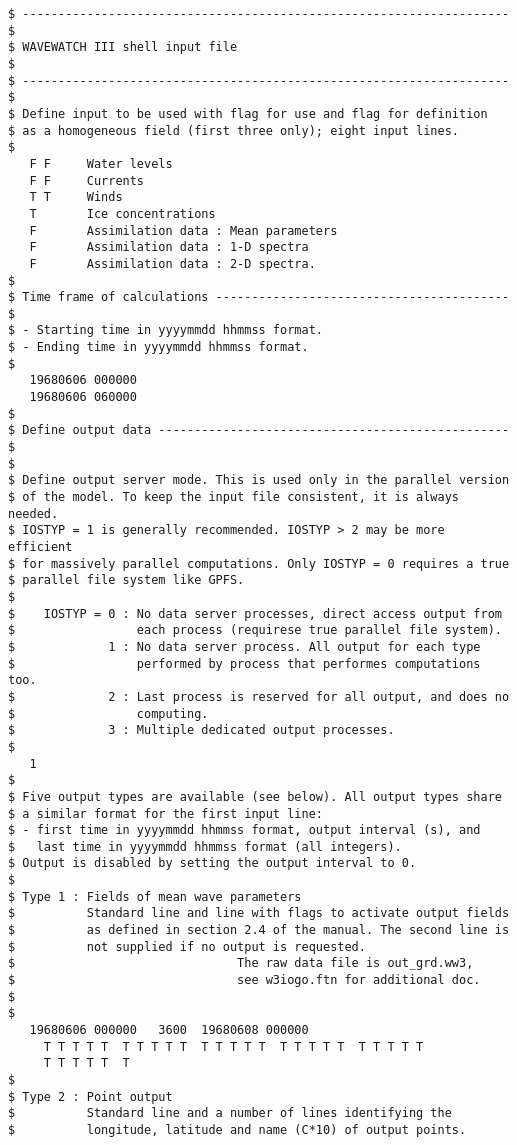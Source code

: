 \begin{verbatim}
$ -------------------------------------------------------------------- $
$ WAVEWATCH III shell input file                                       $
$ -------------------------------------------------------------------- $
$ Define input to be used with flag for use and flag for definition
$ as a homogeneous field (first three only); eight input lines.
$
   F F     Water levels
   F F     Currents
   T T     Winds
   T       Ice concentrations
   F       Assimilation data : Mean parameters
   F       Assimilation data : 1-D spectra
   F       Assimilation data : 2-D spectra.
$
$ Time frame of calculations ----------------------------------------- $
$ - Starting time in yyyymmdd hhmmss format.
$ - Ending time in yyyymmdd hhmmss format.
$
   19680606 000000
   19680606 060000
$
$ Define output data ------------------------------------------------- $
$
$ Define output server mode. This is used only in the parallel version
$ of the model. To keep the input file consistent, it is always needed.
$ IOSTYP = 1 is generally recommended. IOSTYP > 2 may be more efficient
$ for massively parallel computations. Only IOSTYP = 0 requires a true
$ parallel file system like GPFS.
$
$    IOSTYP = 0 : No data server processes, direct access output from
$                 each process (requirese true parallel file system).
$             1 : No data server process. All output for each type 
$                 performed by process that performes computations too.
$             2 : Last process is reserved for all output, and does no
$                 computing.
$             3 : Multiple dedicated output processes.
$
   1
$
$ Five output types are available (see below). All output types share
$ a similar format for the first input line:
$ - first time in yyyymmdd hhmmss format, output interval (s), and 
$   last time in yyyymmdd hhmmss format (all integers).
$ Output is disabled by setting the output interval to 0.
$
$ Type 1 : Fields of mean wave parameters
$          Standard line and line with flags to activate output fields
$          as defined in section 2.4 of the manual. The second line is
$          not supplied if no output is requested.
$                               The raw data file is out_grd.ww3, 
$                               see w3iogo.ftn for additional doc.
$          
$
   19680606 000000   3600  19680608 000000
     T T T T T  T T T T T  T T T T T  T T T T T  T T T T T
     T T T T T  T
$
$ Type 2 : Point output
$          Standard line and a number of lines identifying the 
$          longitude, latitude and name (C*10) of output points.

\end{verbatim}
